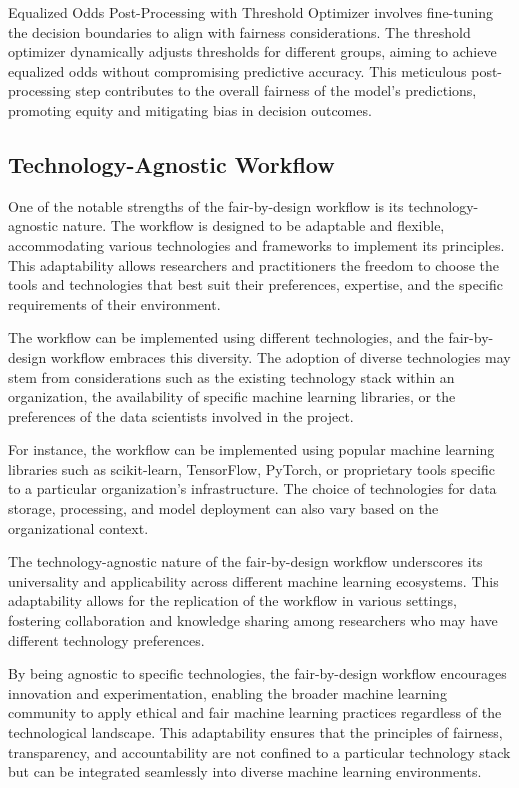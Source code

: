 \documentclass[12pt,a4paper,openright,twoside]{book}
\begin{document}
Equalized Odds Post-Processing with Threshold Optimizer involves fine-tuning the decision boundaries to align with fairness considerations. The threshold optimizer dynamically adjusts thresholds for different groups, aiming to achieve equalized odds without compromising predictive accuracy. This meticulous post-processing step contributes to the overall fairness of the model's predictions, promoting equity and mitigating bias in decision outcomes. 

\subsection{Technology-Agnostic Workflow}

One of the notable strengths of the fair-by-design workflow is its technology-agnostic nature. The workflow is designed to be adaptable and flexible, accommodating various technologies and frameworks to implement its principles. This adaptability allows researchers and practitioners the freedom to choose the tools and technologies that best suit their preferences, expertise, and the specific requirements of their environment.

The workflow can be implemented using different technologies, and the fair-by-design workflow embraces this diversity. The adoption of diverse technologies may stem from considerations such as the existing technology stack within an organization, the availability of specific machine learning libraries, or the preferences of the data scientists involved in the project.

For instance, the workflow can be implemented using popular machine learning libraries such as scikit-learn, TensorFlow, PyTorch, or proprietary tools specific to a particular organization's infrastructure. The choice of technologies for data storage, processing, and model deployment can also vary based on the organizational context.

The technology-agnostic nature of the fair-by-design workflow underscores its universality and applicability across different machine learning ecosystems. This adaptability allows for the replication of the workflow in various settings, fostering collaboration and knowledge sharing among researchers who may have different technology preferences.

By being agnostic to specific technologies, the fair-by-design workflow encourages innovation and experimentation, enabling the broader machine learning community to apply ethical and fair machine learning practices regardless of the technological landscape. This adaptability ensures that the principles of fairness, transparency, and accountability are not confined to a particular technology stack but can be integrated seamlessly into diverse machine learning environments.
\end{document}
